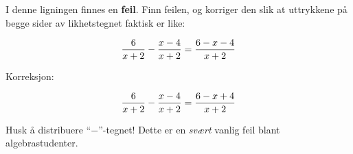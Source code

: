 

I denne ligningen finnes en {\bf feil}. Finn feilen, og korriger den slik at uttrykkene på begge sider av likhetstegnet faktisk er like:

$${6 \over x + 2} - {{x - 4} \over {x + 2}} = {{6 - x - 4} \over {x + 2}}$$







Korreksjon:

$${6 \over x + 2} - {{x - 4} \over {x + 2}} = {{6 - x + 4} \over {x + 2}}$$







Husk å distribuere ``$-$''-tegnet! Dette er en {\it svært} vanlig feil blant algebrastudenter.



